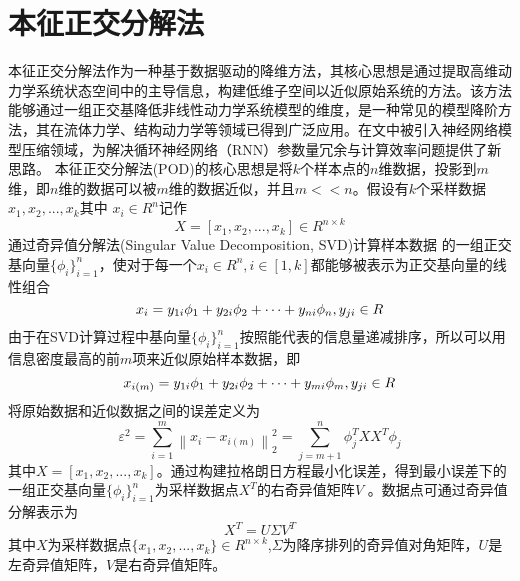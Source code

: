 \section{本征正交分解法}
本征正交分解法\cite{nomura1993structure}作为一种基于数据驱动的降维方法，其核心思想是通过提取高维动力学系统状态空间中的主导信息，构建低维子空间以近似原始系统的方法。该方法能够通过一组正交基降低非线性动力学系统模型的维度，是一种常见的模型降阶方法，其在流体力学、结构动力学等领域已得到广泛应用。在文中被引入神经网络模型压缩领域，为解决循环神经网络（RNN）参数量冗余与计算效率问题提供了新思路。
本征正交分解法(POD)的核心思想是将$k$个样本点的$n$维数据，投影到$m$维，即$n$维的数据可以被$m$维的数据近似，并且$m<<n$。假设有$k$个采样数据${x_1},{x_2},...,{x_k}$其中 ${x_i}\in {R} ^{n}$记作
\begin{equation}
  \label{eq:1}
X = [ {x_1},{x_2},...,{x_k}]  \in {R} ^{n \times k}
\end{equation}
通过奇异值分解法(Singular Value Decomposition, SVD)计算样本数据 的一组正交基向量$\{ {\phi _i}\} _{i = 1}^n$，使对于每一个${x_i} \in {R}^n,i \in [1,k]$都能够被表示为正交基向量的线性组合
\begin{equation}
  \label{eq:2}
{x_i} = {y_{1i}}{\phi _1} + {y_{2i}}{\phi _2} +  \cdots  + {y_{ni}}{\phi _n},{\rm{ }}{y_{ji}} \in {R}
\end{equation}
由于在SVD计算过程中基向量$\{ {\phi _i}\} _{i = 1}^n$按照能代表的信息量递减排序，所以可以用信息密度最高的前$m$项来近似原始样本数据，即
\begin{equation}
  \label{eq:3}
  {x_{i(m)}} = {y_{1i}}{\phi _1} + {y_{2i}}{\phi _2} +  \cdots  + {y_{mi}}{\phi _m},{\rm{ }}{y_{ji}} \in {R}
\end{equation}
将原始数据和近似数据之间的误差定义为
\begin{equation}
  \label{eq:4}
{\varepsilon ^2} = \sum\limits_{i = 1}^m {\left\| {{x_i} - {x_{i(m)}}} \right\|_2^2}  = \sum\limits_{j = m + 1}^n {\phi _j^T} X{X^T}{\phi _j}
\end{equation}
其中$X = [ {x_1},{x_2},...,{x_k}] $。通过构建拉格朗日方程最小化误差，得到最小误差下的一组正交基向量$\{ {\phi _i}\} _{i = 1}^n$为采样数据点${X^T}$的右奇异值矩阵$V$ \cite{chatterjee2000introduction}。数据点可通过奇异值分解表示为
\begin{equation}
\label{eq:5}
  {X^T} = U\Sigma  {V^T}
\end{equation}
其中$X$为采样数据点$\{ {x_1},{x_2},...,{x_k}\}  \in {{R}^{n \times k}}$,$\Sigma $为降序排列的奇异值对角矩阵，$U$是左奇异值矩阵，$V$是右奇异值矩阵。
